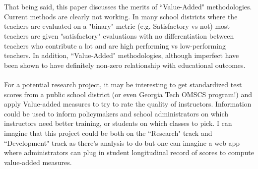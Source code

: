 \documentclass[12pt, final]{article}
\begin{document}
\\
\\
That being said, this paper discusses the merits of ``Value-Added" methodologies. Current methods are clearly not working. In many school districts where the teachers are evaluated on a "binary" metric (e.g. Satisfactory vs not) most teachers are given "satisfactory" evaluations with no differentiation between teachers who contribute a lot and are high performing vs low-performing teachers. In addition, ``Value-Added" methodologies, although imperfect have been shown to have definitely non-zero relationship with educational outcomes.
\\
\\
For a potential research project, it may be interesting to get standardized test scores from a public school district (or even Georgia Tech OMSCS program!) and apply Value-added measures to try to rate the quality of instructors. Information could be used to inform policymakers and school administrators on which instructors need better training, or students on which classes to pick. I can imagine that this project could be both on the ``Research" track and ``Development" track as there's analysis to do but one can imagine a web app where administrators can plug in student longitudinal record of scores to compute value-added measures.
\end{document}
